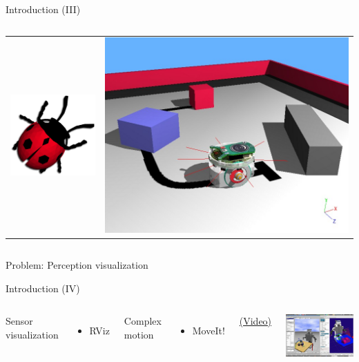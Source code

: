 \documentclass[10pt,compress]{beamer} %
\begin{document}
\begin{frame}{Introduction (III)}
\begin{columns}
\begin{tabular}{cc}
            \includegraphics[width=0.2\linewidth]{figs/webots.png}&
            \includegraphics[width=0.6\linewidth]{figs/webotsScreen.png} \\
        \end{tabular}
	\end{columns}
    \bigskip
	\centering Problem: Perception visualization
\end{frame}

\begin{frame}{Introduction (IV)}
    \begin{columns}
		Sensor visualization
 	 	\begin{itemize}
		\item RViz
		\end{itemize}

		Complex motion
 	 	\begin{itemize}
		\item MoveIt!
		\end{itemize}

        \href{https://youtu.be/i--Sd4xH9ZE}{(Video)}

		\centering\includegraphics[width=\linewidth]{figs/rosgazebo.jpg}\\
	\end{columns}
\end{frame}
\end{document}

